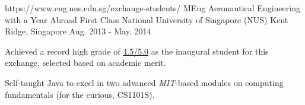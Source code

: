 \begin{cventries}
  \cventry
    {https://www.eng.nus.edu.sg/exchange-students/}
    {MEng Aeronautical Engineering with a Year Abroad} %
    {First Class}
    {National University of Singapore (NUS)} %
    {Kent Ridge, Singapore} %
    {Aug. 2013 - May. 2014} %
    {
      \begin{cvitems} %
        \item {Achieved a record high grade of \underline{4.5/5.0} as the inaugural student for this exchange, selected based on academic merit.}
        \item {Self-taught Java to excel in two advanced \emph{MIT}-based modules on computing fundamentals (for the curious, CS1101S).}
      \end{cvitems}
    }
    
\end{cventries}